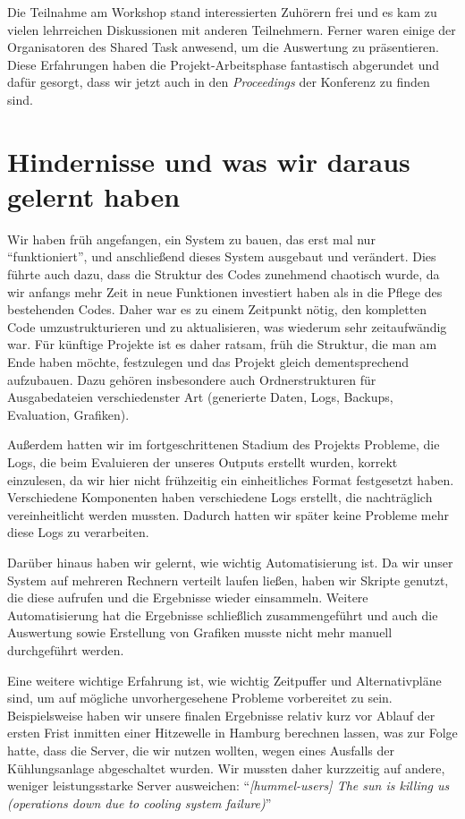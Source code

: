 \documentclass[11pt,a4paper]{article}
\begin{document}
Die Teilnahme am Workshop stand interessierten Zuhörern frei und es kam zu vielen lehrreichen Diskussionen mit anderen Teilnehmern. Ferner waren einige der Organisatoren des Shared Task anwesend, um die Auswertung zu präsentieren. Diese Erfahrungen haben die Projekt-Arbeitsphase fantastisch abgerundet und dafür gesorgt, dass wir jetzt auch in den \textit{Proceedings} der Konferenz zu finden sind.

\section{Hindernisse und was wir daraus gelernt haben}
\label{sec:takeaway}
Wir haben früh angefangen, ein System zu bauen, das erst mal nur \enquote{funktioniert}, und anschließend dieses System ausgebaut und verändert. Dies führte auch dazu, dass die Struktur des Codes zunehmend chaotisch wurde, da wir anfangs mehr Zeit in neue Funktionen investiert haben als in die Pflege des bestehenden Codes. Daher war es zu einem Zeitpunkt nötig, den kompletten Code umzustrukturieren und zu aktualisieren, was wiederum sehr zeitaufwändig war. Für künftige Projekte ist es daher ratsam, früh die Struktur, die man am Ende haben möchte, festzulegen und das Projekt gleich dementsprechend aufzubauen. Dazu gehören insbesondere auch Ordnerstrukturen für Ausgabedateien verschiedenster Art (generierte Daten, Logs, Backups, Evaluation, Grafiken).

Außerdem hatten wir im fortgeschrittenen Stadium des Projekts Probleme, die Logs, die beim Evaluieren der unseres Outputs erstellt wurden, korrekt einzulesen, da wir hier nicht frühzeitig ein einheitliches Format festgesetzt haben. Verschiedene Komponenten haben verschiedene Logs erstellt, die nachträglich vereinheitlicht werden mussten. Dadurch hatten wir später keine Probleme mehr diese Logs zu verarbeiten.

Darüber hinaus haben wir gelernt, wie wichtig Automatisierung ist. Da wir unser System auf mehreren Rechnern verteilt laufen ließen, haben wir Skripte genutzt, die diese aufrufen und die Ergebnisse wieder einsammeln. Weitere Automatisierung hat die Ergebnisse schließlich zusammengeführt und auch die Auswertung sowie Erstellung von Grafiken musste nicht mehr manuell durchgeführt werden.

Eine weitere wichtige Erfahrung ist, wie wichtig Zeitpuffer und Alternativpläne sind, um auf mögliche unvorhergesehene Probleme vorbereitet zu sein. Beispielsweise haben wir unsere finalen Ergebnisse relativ kurz vor Ablauf der ersten Frist inmitten einer Hitzewelle in Hamburg berechnen lassen, was zur Folge hatte, dass die Server, die wir nutzen wollten, wegen eines Ausfalls der Kühlungsanlage abgeschaltet wurden. Wir mussten daher kurzzeitig auf andere, weniger leistungsstarke Server ausweichen:
\foreignquote{english}{\textit{[hummel-users] The sun is killing us (operations down due to cooling system failure)}}
\end{document}
